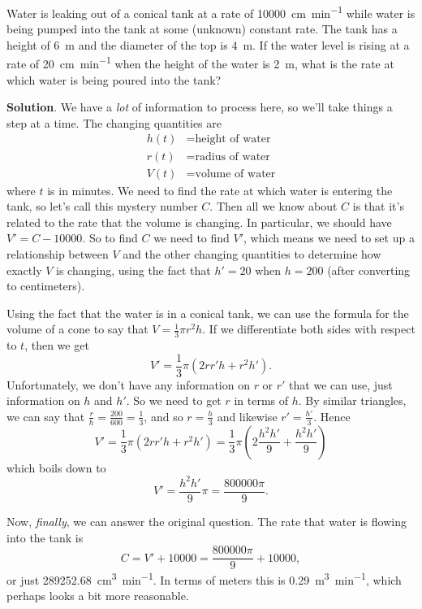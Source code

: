 \documentclass[10pt,]{book}
\theoremstyle{ptxplainnotitle}
\theoremstyle{ptxplaintitle}
\theoremstyle{ptxplainnotitle}
\theoremstyle{ptxplaintitle}
\theoremstyle{ptxplainnotitle}
\theoremstyle{ptxplaintitle}
\theoremstyle{ptxdefinitionnotitle}
\theoremstyle{ptxdefinitiontitle}
\theoremstyle{ptxdefinitionnotitle}
\theoremstyle{ptxdefinitiontitle}
\theoremstyle{ptxdefinitionnotitle}
\theoremstyle{ptxdefinitiontitle}
\theoremstyle{ptxdefinitionnotitle}
\theoremstyle{ptxdefinitiontitle}
\theoremstyle{ptxdefinitionnotitle}
\theoremstyle{ptxdefinitiontitle}
\numberwithin{equation}{section}
\begin{document}
\begin{example}\label{example-a-tank-problem}
\hypertarget{p-172}{}%
Water is leaking out of a conical tank at a rate of \SI{10000}{\centi\meter\per\minute} while water is being pumped into the tank at some (unknown) constant rate. The tank has a height of \SI{6}{\meter} and the diameter of the top is \SI{4}{\meter}. If the water level is rising at a rate of \SI{20}{\centi\meter\per\minute} when the height of the water is \SI{2}{\meter}, what is the rate at which water is being poured into the tank?%
\par\smallskip%
\noindent\textbf{Solution}.\hypertarget{solution-38}{}\quad%
\hypertarget{p-173}{}%
We have a \emph{lot} of information to process here, so we'll take things a step at a time. The changing quantities are%
\begin{align*}
h(t) & = \text{height of water} \\
r(t) & = \text{radius of water} \\
V(t) & = \text{volume of water} 
\end{align*}
where \(t\) is in minutes. We need to find the rate at which water is entering the tank, so let's call this mystery number \(C\). Then all we know about \(C\) is that it's related to the rate that the volume is changing. In particular, we should have \(V' = C - 10000\). So to find \(C\) we need to find \(V'\), which means we need to set up a relationship between \(V\) and the other changing quantities to determine how exactly \(V\) is changing, using the fact that \(h' = 20\) when \(h=200\) (after converting to centimeters).%
\par
\hypertarget{p-174}{}%
Using the fact that the water is in a conical tank, we can use the formula for the volume of a cone to say that \(V = \frac{1}{3}\pi r^{2}h\). If we differentiate both sides with respect to \(t\), then we get%
\begin{equation*}
V' = \frac{1}{3}\pi (2rr'h + r^{2}h').
\end{equation*}
Unfortunately, we don't have any information on \(r\) or \(r'\) that we can use, just information on \(h\) and \(h'\). So we need to get \(r\) in terms of \(h\). By similar triangles, we can say that \(\frac{r}{h} = \frac{200}{600} = \frac{1}{3}\), and so \(r = \frac{h}{3}\) and likewise \(r' = \frac{h'}{3}\). Hence%
\begin{equation*}
V' = \frac{1}{3}\pi (2rr'h + r^{2}h') = \frac{1}{3}\pi \left(2\frac{h^{2}h'}{9} + \frac{h^{2}h'}{9}\right)
\end{equation*}
which boils down to%
\begin{equation*}
V' = \frac{h^{2}h'}{9}\pi = \frac{800000\pi}{9}.
\end{equation*}
%
\par
\hypertarget{p-175}{}%
Now, \emph{finally}, we can answer the original question. The rate that water is flowing into the tank is%
\begin{equation*}
C = V' + 10000 = \frac{800000\pi}{9} + 10000,
\end{equation*}
or just \SI{289252.68}{\centi\meter\tothe{3}\per\minute}. In terms of meters this is \SI{.29}{\meter\tothe{3}\per\minute}, which perhaps looks a bit more reasonable.%
\end{example}
\end{document}
